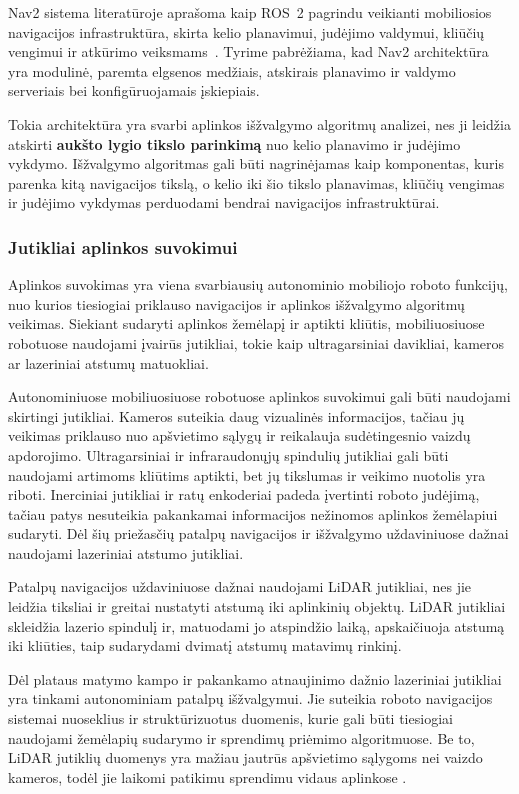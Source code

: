 \documentclass[]{VUMIFTemplateClass}
\begin{document}
Nav2 sistema literatūroje aprašoma kaip ROS~2 pagrindu veikianti mobiliosios navigacijos infrastruktūra, skirta kelio planavimui, judėjimo valdymui, kliūčių vengimui ir atkūrimo veiksmams~\cite{Nav2-Navigation}. Tyrime pabrėžiama, kad Nav2 architektūra yra modulinė, paremta elgsenos medžiais, atskirais planavimo ir valdymo serveriais bei konfigūruojamais įskiepiais.

Tokia architektūra yra svarbi aplinkos išžvalgymo algoritmų analizei, nes ji leidžia atskirti \textbf{aukšto lygio tikslo parinkimą} nuo kelio planavimo ir judėjimo vykdymo. Išžvalgymo algoritmas gali būti nagrinėjamas kaip komponentas, kuris parenka kitą navigacijos tikslą, o kelio iki šio tikslo planavimas, kliūčių vengimas ir judėjimo vykdymas perduodami bendrai navigacijos infrastruktūrai.

\subsubsection{Jutikliai aplinkos suvokimui}

Aplinkos suvokimas yra viena svarbiausių autonominio mobiliojo roboto funkcijų, nuo kurios tiesiogiai priklauso navigacijos ir aplinkos išžvalgymo algoritmų veikimas. Siekiant sudaryti aplinkos žemėlapį ir aptikti kliūtis, mobiliuosiuose robotuose naudojami įvairūs jutikliai, tokie kaip ultragarsiniai davikliai, kameros ar lazeriniai atstumų matuokliai.

Autonominiuose mobiliuosiuose robotuose aplinkos suvokimui gali būti naudojami skirtingi jutikliai. Kameros suteikia daug vizualinės informacijos, tačiau jų
veikimas priklauso nuo apšvietimo sąlygų ir reikalauja sudėtingesnio vaizdų apdorojimo. Ultragarsiniai ir infraraudonųjų spindulių jutikliai gali būti
naudojami artimoms kliūtims aptikti, bet jų tikslumas ir veikimo nuotolis yra riboti. Inerciniai jutikliai ir ratų enkoderiai padeda įvertinti roboto
judėjimą, tačiau patys nesuteikia pakankamai informacijos nežinomos aplinkos žemėlapiui sudaryti. Dėl šių priežasčių patalpų navigacijos ir išžvalgymo
uždaviniuose dažnai naudojami lazeriniai atstumo jutikliai.

Patalpų navigacijos uždaviniuose dažnai naudojami LiDAR jutikliai, nes jie leidžia tiksliai ir greitai nustatyti atstumą iki aplinkinių objektų. LiDAR jutikliai skleidžia lazerio spindulį ir, matuodami jo atspindžio laiką, apskaičiuoja atstumą iki kliūties, taip sudarydami dvimatį atstumų matavimų rinkinį.

Dėl plataus matymo kampo ir pakankamo atnaujinimo dažnio lazeriniai jutikliai yra tinkami autonominiam patalpų išžvalgymui. Jie suteikia roboto navigacijos sistemai nuoseklius ir struktūrizuotus duomenis, kurie gali būti tiesiogiai naudojami žemėlapių sudarymo ir sprendimų priėmimo algoritmuose. Be to, LiDAR jutiklių duomenys yra mažiau jautrūs apšvietimo sąlygoms nei vaizdo kameros, todėl jie laikomi patikimu sprendimu vidaus aplinkose \cite{LDS-02-puslapis}.
\end{document}
